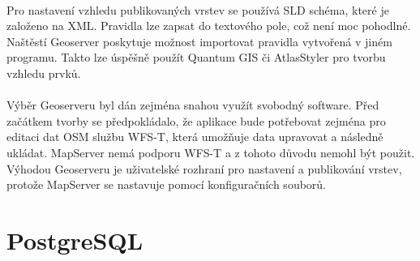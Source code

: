 \documentclass[11pt,a4paper,titlepage,oneside]{book}
\begin{document}

		\paragraph{}Pro nastavení vzhledu publikovaných vrstev se používá \ac{SLD} schéma, které je založeno na  \ac{XML}. Pravidla lze zapsat do textového pole, což není moc pohodlné. Naštěstí Geoserver poskytuje možnost importovat pravidla  vytvořená v jiném programu. Takto lze úspěšně použít Quantum GIS\cite{qgis} či AtlasStyler\cite{atlas} pro tvorbu vzhledu prvků.



		\paragraph{} Výběr Geoserveru byl dán zejména snahou využít svobodný software. Před začátkem tvorby se předpokládalo, že aplikace bude potřebovat zejména pro editaci dat \ac{OSM} službu \ac{WFS-T}, která umožňuje data upravovat a následně ukládat. MapServer nemá podporu \ac{WFS-T} a z tohoto důvodu nemohl být použit. Výhodou Geoserveru je uživatelské rozhraní pro nastavení a publikování vrstev, protože MapServer se nastavuje pomocí konfiguračních souborů.

	\section{PostgreSQL}





\end{document}
